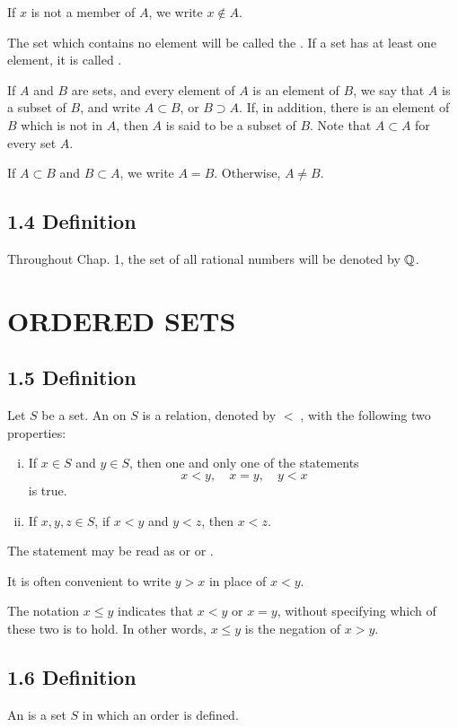 If $x$ is not a member of $A$, we write $x \notin A$.

The set which contains no element will be called the . If a set has at least one element, it is called .

If $A$ and $B$ are sets, and every element of $A$ is an element of $B$, we say that $A$ is a subset of $B$, and write $A \subset B$, or $B \supset A$. If, in addition, there is an element of $B$ which is not in $A$, then $A$ is said to be a  subset of $B$. Note that $A \subset A$ for every set $A$.

If $A \subset B$ and $B \subset A$, we write $A = B$. Otherwise, $A \neq B$.   

\subsection*{1.4 Definition}
Throughout Chap. 1, the set of all rational numbers will be denoted by $\mathbb{Q}$. 


\section*{ORDERED SETS}
\subsection*{1.5 Definition}
Let $S$ be a set. An  on $S$ is a relation, denoted by $<\;$, with the following two properties:
\begin{enumerate}[(i)]
\item If $x \in S$ and $y \in S$, then one and only one of the statements
$$ x < y, \quad x = y, \quad y < x$$
is true. 
\item If $x, y, z \in S$, if $x < y$ and $y < z$, then $x < z$.
\end{enumerate}

The statement  may be read as  or  or .

It is often convenient to write $y > x$ in place of $x < y$.

The notation $x \leq y$ indicates that $x < y$ or $x = y$, without specifying which of these two is to hold. In other words, $x \leq y$ is the negation of $x > y$.

\subsection*{1.6 Definition}
An  is a set $S$ in which an order is defined.


